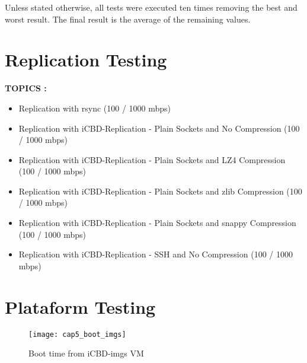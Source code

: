 Unless stated otherwise, all tests were executed ten times removing the best and worst result. The final result is the average of the remaining values. 

\section{Replication Testing}
\label{sec:eval_rep_functional_testing}

\textbf{TOPICS :}
\begin{itemize}
	\item Replication with rsync (100 / 1000 mbps)
	\item Replication with iCBD-Replication - Plain Sockets and No Compression (100 / 1000 mbps)
	\item Replication with iCBD-Replication - Plain Sockets and LZ4 Compression (100 / 1000 mbps)
	\item Replication with iCBD-Replication - Plain Sockets and zlib Compression (100 / 1000 mbps)
	\item Replication with iCBD-Replication - Plain Sockets and snappy Compression (100 / 1000 mbps)
	\item Replication with iCBD-Replication - SSH and No Compression (100 / 1000 mbps)
\end{itemize}




\section{Plataform Testing}
\label{sub:eval_integration_testing}

\begin{figure}[htbp]
	\centering
	\texttt{[image: cap5\_boot\_imgs]}
	\caption{Boot time from iCBD-imgs VM}
	\label{fig:boot_imgs}
\end{figure}

